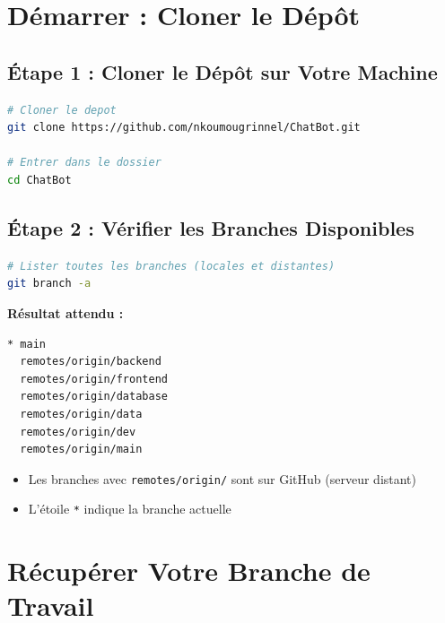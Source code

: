 \documentclass[11pt,a4paper]{article}
\begin{document}
\section{Démarrer : Cloner le Dépôt}
\label{sec:demarrage}

\subsection{Étape 1 : Cloner le Dépôt sur Votre Machine}

\begin{lstlisting}[language=bash, caption=Dans le terminal VS Code ou PowerShell]
# Cloner le depot
git clone https://github.com/nkoumougrinnel/ChatBot.git

# Entrer dans le dossier
cd ChatBot
\end{lstlisting}

\subsection{Étape 2 : Vérifier les Branches Disponibles}

\begin{lstlisting}[language=bash]
# Lister toutes les branches (locales et distantes)
git branch -a
\end{lstlisting}

\textbf{Résultat attendu :}
\begin{lstlisting}
* main
  remotes/origin/backend
  remotes/origin/frontend
  remotes/origin/database
  remotes/origin/data
  remotes/origin/dev
  remotes/origin/main
\end{lstlisting}

\begin{astuce}
\begin{itemize}
    \item Les branches avec \texttt{remotes/origin/} sont sur GitHub (serveur distant)
    \item L'étoile \texttt{*} indique la branche actuelle
\end{itemize}
\end{astuce}

\clearpage

\section{Récupérer Votre Branche de Travail}
\label{sec:recuperer}
\end{document}
